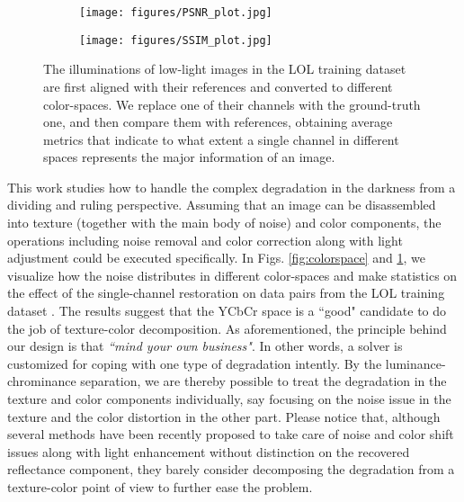 \documentclass[10pt,twocolumn,letterpaper]{article}
\begin{document}
\begin{figure}[t]
\vspace{3pt}
\begin{minipage}{\linewidth}
\begin{subfigure}{0.49\linewidth}
    \texttt{[image: figures/PSNR\_plot.jpg]}
\end{subfigure}
\begin{subfigure}{0.49\linewidth}
    \texttt{[image: figures/SSIM\_plot.jpg]}
\end{subfigure} 
\caption{The illuminations of low-light images in the LOL training dataset are first aligned  with their references and converted to different color-spaces. We replace one of their channels with the ground-truth one, and then compare them with references, obtaining average metrics that indicate to what extent a single channel in different spaces represents the major information of an image. }
\label{fig:colorspace_stat}
\end{minipage}
\end{figure}

This work studies how to handle the complex degradation in the darkness from a dividing and ruling perspective. Assuming that an image can be disassembled into texture (together with the main body of noise) and color components, the operations including noise removal and color correction along with light adjustment could be executed specifically. In Figs. \ref{fig:colorspace} and \ref{fig:colorspace_stat}, we visualize how the noise distributes in different color-spaces and make statistics on the effect of the single-channel restoration on data pairs from the LOL training dataset \cite{DBLP:conf/bmvc/WeiWY018}. The results suggest that the YCbCr space is a ``good" candidate to do the job of texture-color decomposition. As aforementioned, the principle behind our design is that \emph{``mind your own business"}. In other words, a solver is customized for coping with one type of degradation intently. By the luminance-chrominance separation, we are thereby possible to treat the degradation in the texture and color components individually, say focusing on the noise issue in the texture and the color distortion in the other part. Please notice that, although several methods \cite{yang2020fidelity,zhang2021beyond} have been recently proposed to take care of noise and color shift issues along with light enhancement without distinction on the recovered reflectance component, they barely consider decomposing the degradation from a texture-color point of view to further ease the problem.  
\end{document}
